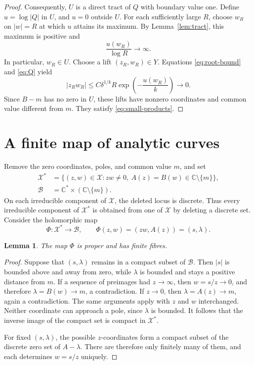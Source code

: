 \documentclass[11pt]{article}
\newtheorem{lemma}[theorem]{Lemma}
\theoremstyle{remark}
\numberwithin{equation}{section}
\newcommand{\C}{\mathbb C}
\newcommand{\X}{\mathcal X}
\newcommand{\B}{\mathcal B}
\begin{document}
\begin{proof}
Consequently, \(U\) is a direct tract of \(Q\) with boundary value
one. Define \(u=\log|Q|\) in \(U\), and \(u=0\) outside \(U\).
For each sufficiently large \(R\), choose \(w_R\) on \(|w|=R\)
at which \(u\) attains its maximum.
By Lemma~\ref{lem:tract}, this maximum is positive and
\[
 \frac{u(w_R)}{\log R}\longrightarrow\infty.
\]
In particular, \(w_R\in U\).
Choose a lift \((z_R,w_R)\in Y\). Equations
\eqref{eq:root-bound} and \eqref{eq:Q} yield
\begin{equation}\label{eq:product-decay}
 |z_Rw_R|
 \le C\delta^{1/k}R\exp\!\left(-\frac{u(w_R)}k\right)
 \longrightarrow0.
\end{equation}
Since \(B-m\) has no zero in \(U\), these lifts have nonzero
coordinates and common value different from \(m\).
They satisfy \eqref{eq:small-products}.
\end{proof}

\section{A finite map of analytic curves}\label{sec:finite}

Remove the zero coordinates, poles, and common value \(m\), and set
\begin{align*}
 \X^*&=\{(z,w)\in\X:zw\ne0,\ A(z)=B(w)\in\C\setminus\{m\}\},\\
 \B&=\C^*\times(\C\setminus\{m\}).
\end{align*}
On each irreducible component of \(\X\), the deleted locus is
discrete. Thus every irreducible component of \(\X^*\) is obtained
from one of \(\X\) by deleting a discrete set.
Consider the holomorphic map
\begin{equation}\label{eq:Phi}
 \Phi:\X^*\longrightarrow\B,
 \qquad \Phi(z,w)=(zw,A(z))=(s,\lambda).
\end{equation}

\begin{lemma}\label{lem:proper}
The map \(\Phi\) is proper and has finite fibres.
\end{lemma}

\begin{proof}
Suppose that \((s,\lambda)\) remains in a compact subset of \(\B\).
Then \(|s|\) is bounded above and away from zero, while \(\lambda\)
is bounded and stays a positive distance from \(m\).
If a sequence of preimages had \(z\to\infty\), then
\(w=s/z\to0\), and therefore \(\lambda=B(w)\to m\), a contradiction.
If \(z\to0\), then \(\lambda=A(z)\to m\), again a contradiction.
The same arguments apply with \(z\) and \(w\) interchanged.
Neither coordinate can approach a pole, since \(\lambda\) is bounded.
It follows that the inverse image of the compact set is compact in
\(\X^*\).

For fixed \((s,\lambda)\), the possible \(z\)-coordinates form a
compact subset of the discrete zero set of \(A-\lambda\).
There are therefore only finitely many of them, and each determines
\(w=s/z\) uniquely.
\end{proof}
\end{document}
